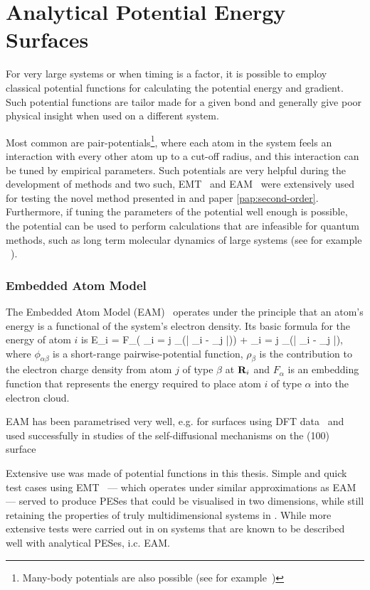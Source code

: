 \section{Analytical Potential Energy Surfaces}
\label{sec:potentials}
For very large systems or when timing is a factor, it is possible to employ classical potential functions for calculating the potential energy and gradient.
Such potential functions are tailor made for a given bond and generally give poor physical insight when used on a different system.

Most common are pair-potentials\footnote{Many-body potentials are also possible (see for example~\cite{stillinger-weber-potential})}, where each atom in the system feels an interaction with every other atom up to a cut-off radius, and this interaction can be tuned by empirical parameters.
Such potentials are very helpful during the development of methods and two such, EMT~\cite{emt-1987} and EAM~\cite{eam-1983} were extensively used for testing the novel method presented in  and paper \ref{pap:second-order}.
Furthermore, if tuning the parameters of the potential well enough is possible, the potential can be used to perform calculations that are infeasible for quantum methods, such as long term molecular dynamics of large systems (see for example ~\cite{long-term-emt-2009}).

\subsubsection{Embedded Atom Model}
The Embedded Atom Model (EAM)~\cite{eam-1983} operates under the principle that an atom's energy is a functional of the system's electron density.
Its basic formula for the energy of atom $i$ is
E_i = F_\alpha \left( \sum_{i \not= j} \rho_\beta(\left| \vR_i - \vR_j \right|)\right) +  \sum_{i \not= j}   \phi_{\alpha\beta}(\left| \vR_i - \vR_j \right|),
\eeq
where $\phi_{\alpha\beta}$ is a short-range pairwise-potential function, $\rho_\beta$ is the contribution to the electron charge density from atom $j$ of type $\beta$ at ${\mathrm{\mathbf{\bm{R}}}}_i$ and $F_\alpha$ is an embedding function that represents the energy required to place atom $i$ of type $\alpha$ into the electron cloud.

EAM has been parametrised very well, e.g. for  surfaces using DFT data~\cite{eam-1986} and used successfully in studies of the self-diffusional mechanisms on the (100) surface~\cite{dimer-original-1999}

Extensive use was made of potential functions in this thesis.
Simple and quick test cases using EMT~\cite{emt-1996} --- which operates under similar approximations as EAM --- served to produce PESes that could be visualised in two dimensions, while still retaining the properties of truly multidimensional systems in .
While more extensive tests were carried out in  on systems that are known to be described well with analytical PESes, i.c. EAM.

